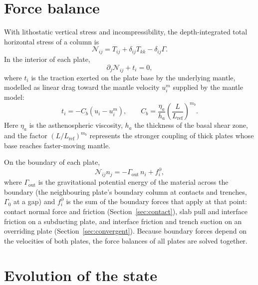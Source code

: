 \documentclass[11pt]{article}
\newcommand{\NN}{\mathcal{N}}
\begin{document}
\section{Force balance}
\label{sec:forcebalance}

With lithostatic vertical stress and incompressibility, the depth-integrated
total horizontal stress of a column is
\begin{equation}
  \NN_{ij} = T_{ij} + \delta_{ij}T_{kk} - \delta_{ij}\Gamma.
\end{equation}
In the interior of each plate,
\begin{equation}
  \partial_j\NN_{ij} + t_i = 0,
  \label{eq:balance}
\end{equation}
where $t_i$ is the traction exerted on the plate base by the underlying mantle,
modelled as linear drag toward the mantle velocity $u^m_i$ supplied by the
mantle model:
\begin{equation}
  t_i = -C_b\left(u_i - u^m_i\right),
  \qquad
  C_b = \frac{\eta_a}{h_a}\left(\frac{L}{L_{\mathrm{ref}}}\right)^{m_b}.
  \label{eq:drag}
\end{equation}
Here $\eta_a$ is the asthenospheric viscosity, $h_a$ the thickness of the basal
shear zone, and the factor $(L/L_{\mathrm{ref}})^{m_b}$ represents the stronger
coupling of thick plates whose base reaches faster-moving mantle.

On the boundary of each plate,
\begin{equation}
  \NN_{ij}n_j = -\Gamma_{\mathrm{out}}\,n_i + f^{\partial}_i,
  \label{eq:bc}
\end{equation}
where $\Gamma_{\mathrm{out}}$ is the gravitational potential energy of the
material across the boundary (the neighbouring plate's boundary column at
contacts and trenches, $\Gamma_0$ at a gap) and $f^{\partial}_i$ is the sum of
the boundary forces that apply at that point: contact normal force and friction
(Section~\ref{sec:contact}), slab pull and interface friction on a subducting
plate, and interface friction and trench suction on an overriding plate
(Section~\ref{sec:convergent}). Because boundary forces depend on the velocities
of both plates, the force balances of all plates are solved together.

\section{Evolution of the state}
\label{sec:kinematics}
\end{document}
